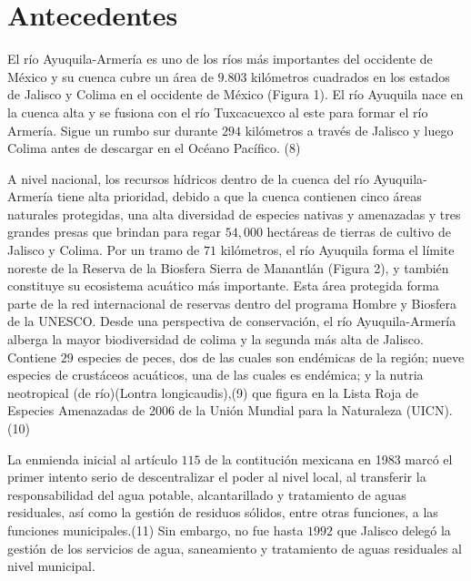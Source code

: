 \section{Antecedentes}
    El río Ayuquila-Armería es uno de los ríos más importantes del occidente de México y su cuenca cubre un área de $9.803$ kilómetros cuadrados en los estados de Jalisco y Colima en el occidente de México (Figura 1). El río Ayuquila nace en la cuenca alta y se fusiona con el río Tuxcacuexco al este para formar el río Armería. Sigue un rumbo sur durante $294$ kilómetros a través de Jalisco y luego Colima antes de descargar en el Océano Pacífico. (8) 

    A nivel nacional, los recursos hídricos dentro de la cuenca del río Ayuquila-Armería tiene alta prioridad, debido a que la cuenca contienen cinco áreas naturales protegidas, una alta diversidad de especies nativas y amenazadas y tres grandes presas que brindan para regar $54,000$ hectáreas de tierras de cultivo de Jalisco y Colima. Por un tramo de $71$ kilómetros, el río Ayuquila forma el límite noreste de la Reserva de la Biosfera Sierra de Manantlán (Figura 2), y también constituye su ecosistema acuático más importante. Esta área protegida forma parte de la red internacional de reservas dentro del programa Hombre y Biosfera de la UNESCO. Desde una perspectiva de conservación, el río Ayuquila-Armería alberga la mayor biodiversidad de colima y la segunda más alta de Jalisco. Contiene $29$ especies de peces, dos de las cuales son endémicas de la región; nueve especies de crustáceos acuáticos, una de las cuales es endémica; y la nutria neotropical (de río)(Lontra longicaudis),(9) que figura en la Lista Roja de Especies Amenazadas de 2006 de la Unión Mundial para la Naturaleza (UICN).(10)

    La enmienda inicial al artículo $115$ de la contitución mexicana en 1983 marcó el primer intento serio de descentralizar el poder al nivel local, al transferir la responsabilidad del agua potable, alcantarillado y tratamiento de aguas residuales, así como la gestión de residuos sólidos, entre otras funciones, a las funciones municipales.(11) Sin embargo, no fue hasta $1992$ que Jalisco delegó la gestión de los servicios de agua, saneamiento y tratamiento de aguas residuales al nivel municipal.

